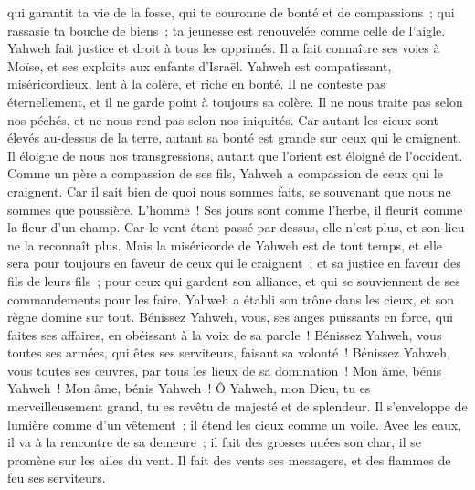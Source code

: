 \begin{multicols}{2}
qui garantit ta vie de la fosse, qui te couronne de bonté et de compassions~;
qui rassasie ta bouche de biens~; ta jeunesse est renouvelée comme celle de l'aigle.
Yahweh fait justice et droit à tous les opprimés.
Il a fait connaître ses voies à Moïse, et ses exploits aux enfants d'Israël.
Yahweh est compatissant, miséricordieux, lent à la colère, et riche en bonté.
Il ne conteste pas éternellement, et il ne garde point à toujours sa colère.
Il ne nous traite pas selon nos péchés, et ne nous rend pas selon nos iniquités.
Car autant les cieux sont élevés au-dessus de la terre, autant sa bonté est grande sur ceux qui le craignent.
Il éloigne de nous nos transgressions, autant que l'orient est éloigné de l'occident.
Comme un père a compassion de ses fils, Yahweh a compassion de ceux qui le craignent.
Car il sait bien de quoi nous sommes faits, se souvenant que nous ne sommes que poussière.
L'homme~! Ses jours sont comme l'herbe, il fleurit comme la fleur d'un champ.
Car le vent étant passé par-dessus, elle n'est plus, et son lieu ne la reconnaît plus.
Mais la miséricorde de Yahweh est de tout temps, et elle sera pour toujours en faveur de ceux qui le craignent~; et sa justice en faveur des fils de leurs fils~;
pour ceux qui gardent son alliance, et qui se souviennent de ses commandements pour les faire.
Yahweh a établi son trône dans les cieux, et son règne domine sur tout.
Bénissez Yahweh, vous, ses anges puissants en force, qui faites ses affaires, en obéissant à la voix de sa parole~!
Bénissez Yahweh, vous toutes ses armées, qui êtes ses serviteurs, faisant sa volonté~!
Bénissez Yahweh, vous toutes ses œuvres, par tous les lieux de sa domination~! Mon âme, bénis Yahweh~!
\VerseOne{}Mon âme, bénis Yahweh~! Ô Yahweh, mon Dieu, tu es merveilleusement grand, tu es revêtu de majesté et de splendeur.
Il s'enveloppe de lumière comme d'un vêtement~; il étend les cieux comme un voile.
Avec les eaux, il va à la rencontre de sa demeure~; il fait des grosses nuées son char, il se promène sur les ailes du vent.
Il fait des vents ses messagers, et des flammes de feu ses serviteurs.

\end{multicols}
